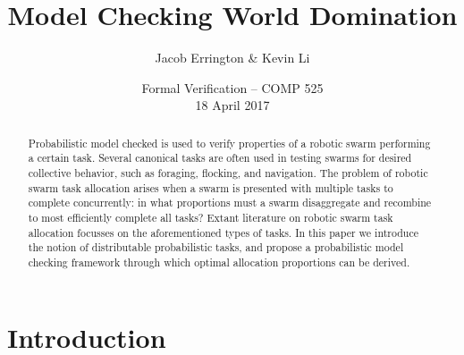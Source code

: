 \documentclass[11pt]{article}
\title{Model Checking World Domination}
\author{Jacob Errington \& Kevin Li}
\date{Formal Verification -- COMP 525\\18 April 2017}
\theoremstyle{definition}
\begin{document}
\maketitle

\begin{abstract}
    Probabilistic model checked is used to verify properties of a robotic swarm
    performing a certain task.
    Several canonical tasks are often used in testing swarms for desired
    collective behavior, such as foraging, flocking, and navigation.
    The problem of robotic swarm task allocation arises when a swarm is
    presented with multiple tasks to complete concurrently: in what proportions
    must a swarm disaggregate and recombine to most efficiently complete all
    tasks?
    Extant literature on robotic swarm task allocation focusses on the
    aforementioned types of tasks.
    In this paper we introduce the notion of distributable probabilistic tasks,
    and propose a probabilistic model checking framework through which optimal
    allocation proportions can be derived.
\end{abstract}

\section{Introduction}
\label{sec:intro}
\end{document}

